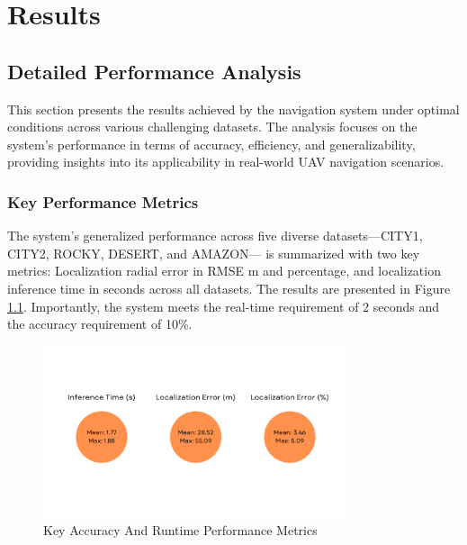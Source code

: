 
\chapter{Results}

\section{Detailed Performance Analysis}

This section presents the results achieved by the navigation system under optimal conditions across various challenging datasets. The analysis focuses on the system's performance in terms of accuracy, efficiency, and generalizability, providing insights into its applicability in real-world UAV navigation scenarios.



\subsection{Key Performance Metrics}

The system's generalized performance across five diverse datasets—CITY1, CITY2, ROCKY, DESERT, and AMAZON— is summarized with two key metrics: Localization radial error in RMSE m and percentage, and localization inference time in seconds across all datasets. The results are presented in Figure \ref{fig:Key Metrics}. Importantly, the system meets the real-time requirement of 2 seconds and the accuracy requirement of 10\%. 

\begin{figure}[H]
    \centering
    \includegraphics[width=0.8\textwidth]{./Chapter 5/RESULTPLOTS/Metrics_Raw.png}
    \caption{Key Accuracy And Runtime Performance Metrics}
    \label{fig:Key Metrics}
\end{figure}





